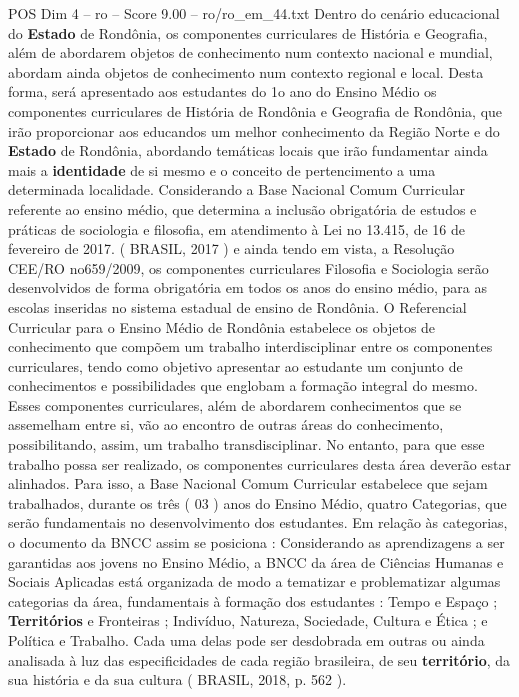 \begin{textsample}{POS Dim 4 – ro – Score 9.00 – ro/ro\_em\_44.txt}
Dentro do cenário educacional do \textbf{Estado} de Rondônia, os componentes curriculares de História e Geografia, além de abordarem objetos de conhecimento num contexto nacional e mundial, abordam ainda objetos de conhecimento num contexto regional e local.
Desta forma, será apresentado aos estudantes do 1o ano do Ensino Médio os componentes curriculares de História de Rondônia e Geografia de Rondônia, que irão proporcionar aos educandos um melhor conhecimento da Região Norte e do \textbf{Estado} de Rondônia, abordando temáticas locais que irão fundamentar ainda mais a \textbf{identidade} de si mesmo e o conceito de pertencimento a uma determinada localidade.
Considerando a Base Nacional Comum Curricular referente ao ensino médio, que determina a inclusão obrigatória de estudos e práticas de sociologia e filosofia, em atendimento à Lei no 13.415, de 16 de fevereiro de 2017. ( BRASIL, 2017 ) e ainda tendo em vista, a Resolução CEE/RO no659/2009, os componentes curriculares Filosofia e Sociologia serão desenvolvidos de forma obrigatória em todos os anos do ensino médio, para as escolas inseridas no sistema estadual de ensino de Rondônia.
O Referencial Curricular para o Ensino Médio de Rondônia estabelece os objetos de conhecimento que compõem um trabalho interdisciplinar entre os componentes curriculares, tendo como objetivo apresentar ao estudante um conjunto de conhecimentos e possibilidades que englobam a formação integral do mesmo.
Esses componentes curriculares, além de abordarem conhecimentos que se assemelham entre si, vão ao encontro de outras áreas do conhecimento, possibilitando, assim, um trabalho transdisciplinar.
No entanto, para que esse trabalho possa ser realizado, os componentes curriculares desta área deverão estar alinhados.
Para isso, a Base Nacional Comum Curricular estabelece que sejam trabalhados, durante os três ( 03 ) anos do Ensino Médio, quatro Categorias, que serão fundamentais no desenvolvimento dos estudantes.
Em relação às categorias, o documento da BNCC assim se posiciona : Considerando as aprendizagens a ser garantidas aos jovens no Ensino Médio, a BNCC da área de Ciências Humanas e Sociais Aplicadas está organizada de modo a tematizar e problematizar algumas categorias da área, fundamentais à formação dos estudantes : Tempo e Espaço ; \textbf{Territórios} e Fronteiras ; Indivíduo, Natureza, Sociedade, Cultura e Ética ; e Política e Trabalho.
Cada uma delas pode ser desdobrada em outras ou ainda analisada à luz das especificidades de cada região brasileira, de seu \textbf{território}, da sua história e da sua cultura ( BRASIL, 2018, p. 562 ).

\end{textsample}
